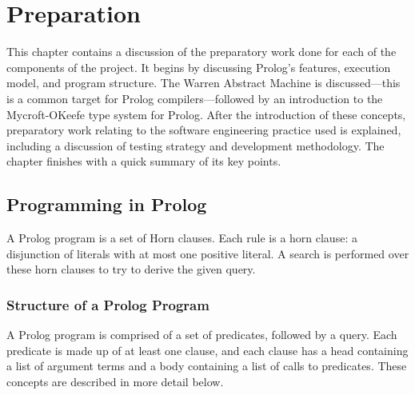 \documentclass[12pt,a4paper]{report}
\begin{document}
\chapter{Preparation} 

This chapter contains a discussion of the preparatory work done for each of the components of the project. It begins by discussing Prolog's features, execution model, and program structure. The Warren Abstract Machine is discussed---this is a common target for Prolog compilers---followed by an introduction to the Mycroft-OKeefe type system for Prolog. After the introduction of these concepts, preparatory work relating to the software engineering practice used  is explained, including a discussion of testing strategy and development methodology. The chapter finishes with a quick summary of its key points.

\section{Programming in Prolog}


A Prolog program is a set of Horn clauses. Each rule is a horn clause: a disjunction of literals with at most one positive literal. A search is performed over these horn clauses to try to derive the given query.

\subsection{Structure of a Prolog Program}

A Prolog program is comprised of a set of predicates, followed by a query. Each predicate is made up of at least one clause, and each clause has a head containing a list of argument terms and a body containing a list of calls to predicates. These concepts are described in more detail below.
\end{document}
